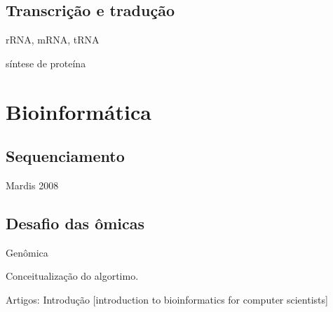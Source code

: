 \cite{setubal97}

\subsection{Transcrição e tradução} \label{sinteseDeProteina:transcricaoTraducaoSintese}

\indent rRNA, mRNA, tRNA

\indent síntese de proteína



\section{Bioinformática} \label{bioinformatica}

\subsection{Sequenciamento} 

\indent Mardis 2008

\subsection{Desafio das ômicas}

\indent 
Genômica

\indent Conceitualização do algortimo.

Artigos:
Introdução
[introduction to bioinformatics for computer scientists]
